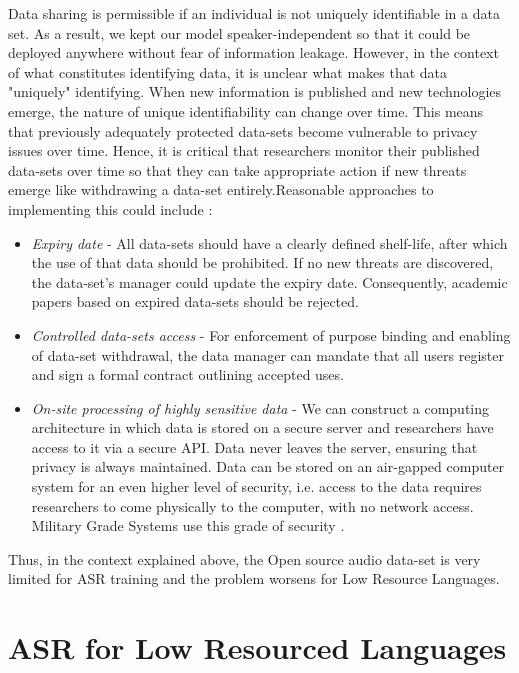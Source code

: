 Data sharing is permissible if an individual is not uniquely identifiable in a data set. As a result, we kept our model speaker-independent so that it could be deployed anywhere without fear of information leakage. However, in the context of what constitutes identifying data, it is unclear what makes that data "uniquely" identifying. When new information is published and new technologies emerge, the nature of unique identifiability can change over time. This means that previously adequately protected data-sets become vulnerable to privacy issues over time. Hence, it is critical that researchers monitor their published data-sets over time so that they can take appropriate action if new threats emerge like withdrawing a data-set entirely.Reasonable approaches to implementing this could include \cite{backstrom_introduction_2022}:

\begin{itemize}
    \item \textit{Expiry date} - All data-sets should have a clearly defined shelf-life, after which the use of that data should be prohibited. If no new threats are discovered, the data-set's manager could update the expiry date. Consequently, academic papers based on expired data-sets should be rejected.
    \item\textit{Controlled data-sets access} - For enforcement of purpose binding and enabling of data-set withdrawal, the data manager can mandate that all users register and sign a formal contract outlining accepted uses.
    \item \textit{On-site processing of highly sensitive data} - We can construct a computing architecture in which data is stored on a secure server and researchers have access to it via a secure API. Data never leaves the server, ensuring that privacy is always maintained. Data can be stored on an air-gapped computer system for an even higher level of security, i.e. access to the data requires researchers to come physically to the computer, with no network access. Military Grade Systems use this grade of security \cite{backstrom_introduction_2022}.
\end{itemize}

Thus, in the context explained above, the Open source audio data-set is very limited for ASR training and the problem worsens for Low Resource Languages. 

\section{ASR for Low Resourced Languages}
\label{sec:ASR_for_Low_Resourced_Languages}

